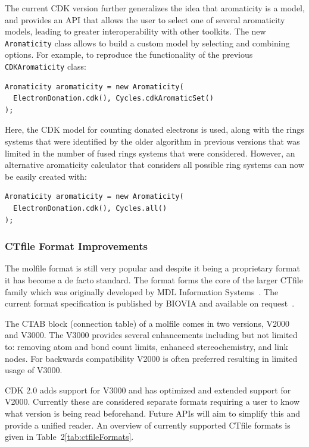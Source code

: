 \documentclass[10pt]{bmcart}
\def \cdkversion {2.0}
\begin{document}
The current CDK version further generalizes the idea that aromaticity
is a model, and provides an API that allows the user to select one of
several aromaticity models, leading to greater interoperability with
other toolkits. The new \texttt{Aromaticity} class allows to build a
custom model by selecting and combining options. For example, to
reproduce the functionality of the previous \texttt{CDKAromaticity} class:

\vspace{0.2cm}
\begin{verbatim}
Aromaticity aromaticity = new Aromaticity(
  ElectronDonation.cdk(), Cycles.cdkAromaticSet()
);
\end{verbatim}
\vspace{0.2cm}

Here, the CDK model for counting donated electrons is used, along with
the rings systems that were identified by the older algorithm in
previous versions that was limited in the number of fused rings
systems that were considered. However, an alternative aromaticity
calculator that considers all possible ring systems can now be
easily created with:

\vspace{0.2cm}
\begin{verbatim}
Aromaticity aromaticity = new Aromaticity(
  ElectronDonation.cdk(), Cycles.all()
);
\end{verbatim}
\vspace{0.2cm}

\subsubsection*{CTfile Format Improvements}

The molfile format is still very popular and despite it being a proprietary
format it has become a de facto standard. The format forms the core of the larger
CTfile family which was originally developed by MDL Information Systems~\cite{Dalby92}. The
current format specification is published by BIOVIA and available on 
request~\cite{ctfilespec}.
 
The CTAB block (connection table) of a molfile comes in two versions, V2000
and V3000. The V3000 provides several enhancements including but not
limited to: removing atom and bond count limits, enhanced stereochemistry,
and link nodes. For backwards compatibility V2000 is often preferred resulting
in limited usage of V3000.

CDK \cdkversion{} adds support for V3000 and has optimized and extended
support for V2000. Currently these are considered separate formats requiring
a user to know what version is being read beforehand. Future APIs will aim
to simplify this and provide a unified reader. An overview of currently
supported CTfile formats is given in Table~2\ref{tab:ctfileFormats}.
\end{document}
